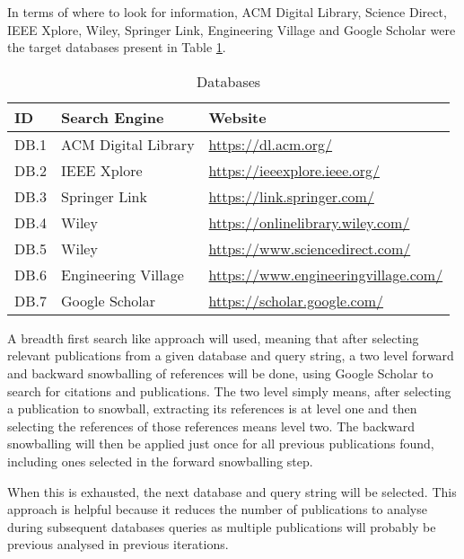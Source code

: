 \documentclass[conference]{IEEEtran}
\begin{document}
In terms of where to look for information, ACM Digital Library, Science Direct,
IEEE Xplore, Wiley, Springer Link, Engineering Village and Google Scholar were
the target databases present in Table \ref{tab:databases}.

\begin{table}[H] \caption{Databases} \label{tab:databases}
  \begin{center}
    \begin{tabular}[c]{l|l|l} \textbf{ID} & \textbf{Search Engine} &
      \textbf{Website} \\
      \hline DB.1 & ACM Digital Library & \url{https://dl.acm.org/} \\
      \hline DB.2 & IEEE Xplore & \url{https://ieeexplore.ieee.org/} \\
      \hline DB.3 & Springer Link & \url{https://link.springer.com/} \\
      \hline DB.4 & Wiley & \url{https://onlinelibrary.wiley.com/} \\
      \hline DB.5 & Wiley & \url{https://www.sciencedirect.com/} \\
      \hline DB.6 & Engineering Village &
      \url{https://www.engineeringvillage.com/} \\
      \hline DB.7 & Google Scholar & \url{https://scholar.google.com/} \\
    \end{tabular}
  \end{center}
\end{table}



A breadth first search like approach will used, meaning that after selecting
relevant publications from a given database and query string, a two level
forward and backward snowballing of references will be done, using Google
Scholar to search for citations and publications. The two level simply means,
after selecting a publication to snowball, extracting its references is at
level one and then selecting the references of those references means level
two. The backward snowballing will then be applied just once for all previous
publications found, including ones selected in the forward snowballing step.

When this is exhausted, the next database and query string will be selected.
This approach is helpful because it reduces the number of publications to
analyse during subsequent databases queries as multiple publications will
probably be previous analysed in previous iterations.
\end{document}

